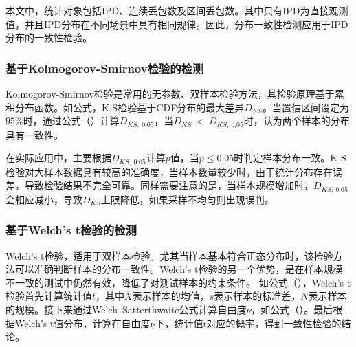 本文中，统计对象包括IPD、连续丢包数及区间丢包数。其中只有IPD为直接观测值，并且IPD分布在不同场景中具有相同规律。因此，分布一致性检测应用于IPD分布的一致性检验。

\subsubsection{基于Kolmogorov-Smirnov检验的检测}
\label{chap:analyze:statistical:test:ks}

Kolmogorov-Smirnov检验是常用的无参数、双样本检验方法，其检验原理基于累积分布函数。如公式，K-S检验基于CDF分布的最大差异$D_{KS}$。当置信区间设定为$95\%$时，通过公式（）计算$D_{KS,\ 0.05}$，当$D_{KS}\ <\ D_{KS,\ 0.05}$时，认为两个样本的分布具有一致性。

在实际应用中，主要根据$D_{KS,\ 0.05}$计算$p$值，当$p\leq 0.05$时判定样本分布一致。K-S检验对大样本数据具有较高的准确度，当样本数量较少时，由于统计分布存在误差，导致检验结果不完全可靠。同样需要注意的是，当样本规模增加时，$D_{KS,\ 0.05}$会相应减小，导致$D_{KS}$上限降低，如果采样不均匀则出现误判。

\subsubsection{基于Welch's t检验的检测}
\label{chap:analyze:statistical:test:t}

Welch's t检验，适用于双样本检验。尤其当样本基本符合正态分布时，该检验方法可以准确判断样本的分布一致性。Welch's t检验的另一个优势，是在样本规模不一致的测试中仍然有效，降低了对测试样本的约束条件。
如公式（），Welch's t检验首先计算统计值$t$，其中$\overline{X}$表示样本的均值，$s$表示样本的标准差，$N$表示样本的规模。接下来通过Welch–Satterthwaite公式计算自由度$\nu$，如公式（）。最后根据Welch's t值分布，计算在自由度$\nu$下，统计值$t$对应的概率，得到一致性检验的结论。

